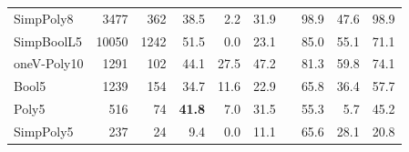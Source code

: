 \begin{table}[H]
\begin{tabular}{l r r rrr r rrr}
SimpPoly8    &   3477 &   362 & 38.5 &  2.2 & 31.9 & & 98.9 & 47.6 &  98.9 \\
SimpBoolL5   &  10050 &  1242 & 51.5 &  0.0 & 23.1 & & 85.0 & 55.1 &  71.1 \\
oneV-Poly10  &   1291 &   102 & 44.1 & 27.5 & 47.2 & & 81.3 & 59.8 &  74.1 \\
Bool5        &   1239 &   154 & 34.7 & 11.6 & 22.9 & & 65.8 & 36.4 &  57.7 \\
Poly5        &    516 &    74 & \textbf{41.8} &  7.0 & 31.5 & & 55.3 &  5.7 &  45.2 \\
SimpPoly5    &    237 &    24 &  9.4 &  0.0 & 11.1 & & 65.6 & 28.1 &  20.8 \\
\bottomrule
\end{tabular}
\end{table}

